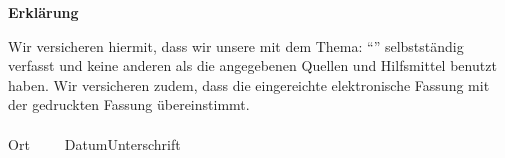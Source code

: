 





 






 

\newpage
\thispagestyle{empty}
\begin{framed}
\begin{center}
\Large\bfseries Erklärung
\end{center}
\medskip
\noindent
Wir versicheren hiermit, dass wir unsere \Was mit dem Thema:
\enquote{\Titel}
selbstständig verfasst und keine anderen als die angegebenen Quellen und Hilfsmittel benutzt haben. Wir versicheren zudem, dass die eingereichte elektronische Fassung mit der gedruckten Fassung übereinstimmt.
\vspace{3cm}
\\
\noindent
\underline{\hspace{4cm}}\hfill\underline{\hspace{6cm}}\\
Ort~~~~~Datum\hfill Unterschrift\hspace{4cm}
\end{framed} 

